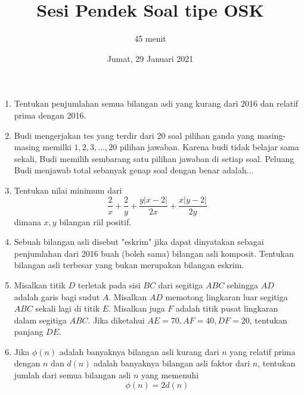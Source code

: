 \documentclass[12pt]{scrartcl}
\title{Sesi Pendek Soal tipe OSK}
\author{45 menit}
\date{Jumat, 29 Januari 2021}
\begin{document}
	\maketitle

\renewcommand*\contentsname{Daftar Isi}
\tableofcontents

\newpage
	
	\begin{enumerate}
		\item
		Tentukan penjumlahan semua bilangan asli yang kurang dari 2016 dan relatif prima dengan 2016.
		
		\item 
		Budi mengerjakan tes yang terdir dari 20 soal pilihan ganda yang masing-masing memilki $1,2,3,...,20$ pilihan jawaban. Karena budi tidak belajar sama sekali, Budi memilih sembarang satu pilihan jawaban di setiap soal. Peluang Budi menjawab total sebanyak genap soal dengan benar adalah...
		
		\item
		Tentukan nilai minimum dari $$\frac{2}{x}+\frac{2}{y}+\frac{y|x-2|}{2x}+\frac{x|y-2|}{2y}$$dimana $x,y$ bilangan riil positif.
		
		\item
		Sebuah bilangan asli disebut "eskrim" jika dapat dinyatakan sebagai penjumlahan dari 2016 buah (boleh sama) bilangan asli komposit. Tentukan bilangan asli terbesar yang bukan merupakan bilangan eskrim.
		
		\item
		Misalkan titik $D$ terletak pada sisi $BC$ dari segitiga $ABC$ sehingga $AD$ adalah garis bagi sudut $A$. Misalkan $AD$ memotong lingkaran luar segitiga $ABC$ sekali lagi di titik $E$. Misalkan juga $F$ adalah titik pusat lingkaran dalam segitiga $ABC$. Jika diketahui $AE=70, AF=40, DF=20$, tentukan panjang $DE$.
		
		\item
		Jika $\phi(n)$ adalah banyaknya bilangan asli kurang dari $n$ yang relatif prima dengan $n$ dan $d(n)$ adalah banyaknya bilangan asli faktor dari $n$, tentukan jumlah dari semua bilangan asli $n$ yang memenuhi $$\phi(n)=2d(n)$$
		
		
	\end{enumerate}
		
\end{document}
